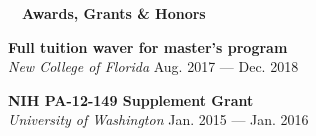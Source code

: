 \documentclass[a4paper,12pt]{article}
\newcommand{\resheading}[1]{{\hspace{-9pt} \colorbox{mygrey}{\begin{minipage}{\textwidth}{\textmd{~~\large \textbf{#1} \vphantom{p\^{E}}}}\end{minipage}}\vspace{6pt}} }
\newcommand{\ressubheading}[4]{{\begin{minipage}{\textwidth}
        \textbf{#1} \hfill #2 \\
        \textit{#3} \hfill #4 \\
        \end{minipage}}}
\begin{document}
        

        
        
\resheading{Awards, Grants \& Honors}
     \ressubheading{Full tuition waver for master's program}{}{New College of Florida}{Aug. 2017 ---  Dec. 2018}
         
    \ressubheading{NIH PA-12-149 Supplement Grant}{}{University of Washington}{Jan. 2015 --- Jan. 2016}
\end{document}
